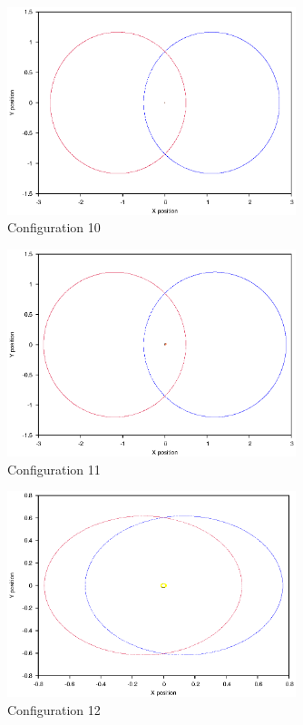 \documentclass[a4paper,12pt]{article}
\begin{document}
\begin{figure}[H]
\centering
\includegraphics[width=0.75\textwidth]{./results/01-7-01-2/Orbit.eps}
\caption{Configuration 10}
\label{fig:config10}
\end{figure}
\begin{figure}[H]
\centering
\includegraphics[width=0.75\textwidth]{./results/02-75-02-1/Orbit.eps}
\caption{Configuration 11}
\label{fig:config11}
\end{figure}
\begin{figure}[H]
\centering
\includegraphics[width=0.75\textwidth]{./results/025-65-02/Orbit.eps}
\caption{Configuration 12}
\label{fig:config12}
\end{figure}
\end{document}
